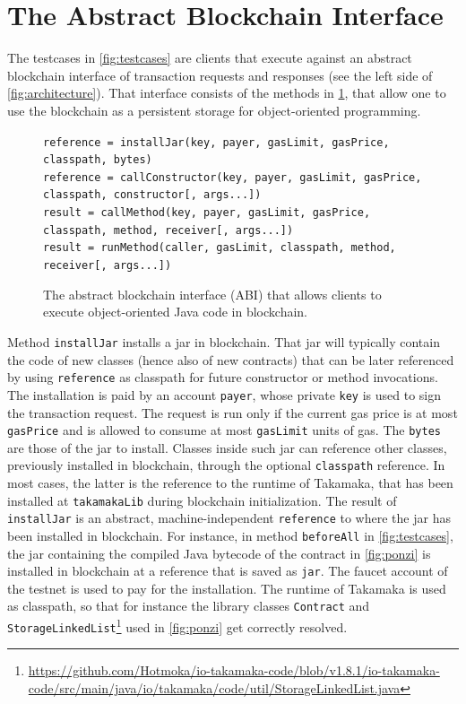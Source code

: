 \section{The Abstract Blockchain Interface}\label{sec:interface}

The testcases in \cref{fig:testcases} are clients that
execute against an abstract blockchain interface
of transaction requests and responses (see the left side of \cref{fig:architecture}).
That interface consists of the methods in \cref{fig:api}, that allow one to use the blockchain
as a persistent storage for object-oriented programming.
%
\begin{figure}
  \begin{description}
  \item[\texttt{reference = installJar(key, payer, gasLimit, gasPrice, classpath, bytes)}]
  \item[\texttt{reference = callConstructor(key, payer, gasLimit, gasPrice, classpath, constructor[, args...])}]
  \item[\texttt{result = callMethod(key, payer, gasLimit, gasPrice, classpath, method, receiver[, args...])}]
  \item[\texttt{result = runMethod(caller, gasLimit, classpath, method, receiver[, args...])}]
  \end{description}
  \caption{The abstract blockchain interface (ABI) that allows clients to execute
  object-oriented Java code in blockchain.}
  \label{fig:api}
\end{figure}

Method \texttt{installJar} installs a jar in blockchain.
That jar will typically contain the code of new classes (hence also of new contracts)
that can be later referenced by using \texttt{reference} as classpath for future constructor or method
invocations. The installation is paid by an account \texttt{payer}, whose private \texttt{key} is used
to sign the transaction request. The request is run only if the current gas price is at most
\texttt{gasPrice} and is allowed to consume at most \texttt{gasLimit} units of gas. The \texttt{bytes}
are those of the jar to install. Classes inside such jar can reference other classes, previously
installed in blockchain, through the optional \texttt{classpath} reference. In most cases, the latter
is the reference to the runtime of Takamaka, that has been installed at
\texttt{takamakaLib} during blockchain initialization. The result of \texttt{installJar} is
an abstract, machine-independent \texttt{reference} to where the jar has been installed in blockchain.
For instance, in method \texttt{beforeAll}
in \cref{fig:testcases}, the jar containing the compiled Java bytecode of the contract in
\cref{fig:ponzi} is installed in blockchain at a reference that is saved as \texttt{jar}.
The faucet account of the testnet is used to pay for the installation. The runtime of Takamaka
is used as classpath, so that for instance the library classes \texttt{Contract} and
\texttt{StorageLinkedList}\footnote{\url{https://github.com/Hotmoka/io-takamaka-code/blob/v1.8.1/io-takamaka-code/src/main/java/io/takamaka/code/util/StorageLinkedList.java}} used in \cref{fig:ponzi} get correctly resolved.

